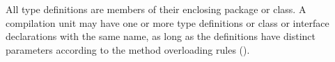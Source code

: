 All type definitions are members of their enclosing package or
class.  A compilation unit may have one or more type definitions
or class or interface declarations with the same name, as long
as the definitions have distinct parameters according to the
method overloading rules ().
\fi

